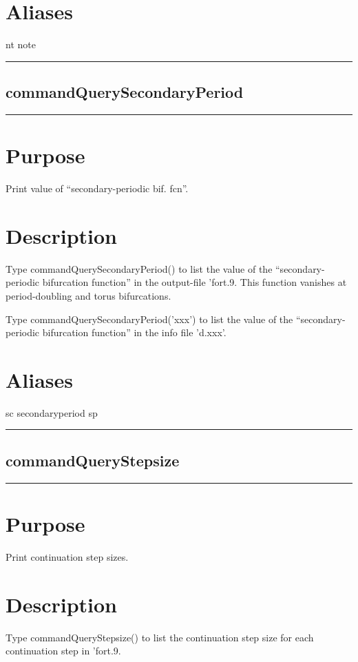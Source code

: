 \documentclass[12pt]{report}
\begin{document}
\begin{minipage}{6in}
    \section*{Aliases}
nt note \medskip\hrule\end{minipage}\subsection{commandQuerySecondaryPeriod} \label{sec:clui_ref_commandQuerySecondaryPeriod}\begin{minipage}{6in}\hrule\medskip\section*{Purpose}
Print value of ``secondary-periodic bif. fcn''.\section*{Description}

    Type commandQuerySecondaryPeriod()  to list the value of the 
    ``secondary-periodic bifurcation function'' 
    in the output-file 'fort.9. This function
    vanishes at period-doubling and torus bifurcations.

    Type commandQuerySecondaryPeriod('xxx') to list the value of the
    ``secondary-periodic bifurcation function''
    in the info file 'd.xxx'.
    \section*{Aliases}
sc secondaryperiod sp \medskip\hrule\end{minipage}\subsection{commandQueryStepsize} \label{sec:clui_ref_commandQueryStepsize}\begin{minipage}{6in}\hrule\medskip\section*{Purpose}
Print continuation step sizes.\section*{Description}

    Type commandQueryStepsize() to list the continuation step size for each
    continuation step in  'fort.9. 


\end{minipage}
\end{document}
